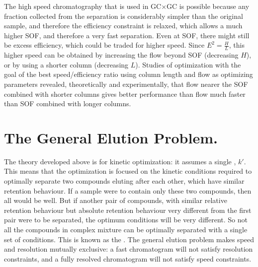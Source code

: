 The high speed chromatography that is used in GC×GC is possible because any
fraction collected from the \oneD separation is considerably simpler than the
original sample, and therefore the efficiency constraint is relaxed, which
allows a much higher SOF, and therefore a very fast \twoD
separation. Even at SOF, there might still be excess efficiency, which could be
traded for higher speed. Since \(E^2 = \frac{H}{L} \), this higher speed can be
obtained by increasing the flow beyond SOF (decreasing \(H\)), or by using a
shorter column (decreasing \(L\)). Studies of optimization with the goal of the
best speed/efficiency ratio using column length and flow as optimizing
parameters revealed, theoretically and experimentally, that flow nearer the SOF
combined with shorter columns gives better performance \autocite{Klee2002,
Reed1999} than flow much faster than SOF combined with longer columns.

\section{The General Elution Problem.}

The theory developed above is for kinetic optimization: it assumes a single
, \(k'\). This means that the optimization is focused
on the kinetic conditions required to optimally separate two compounds eluting
after each other, which have similar retention behaviour. If a sample were to
contain only these two compounds, then all would be well. But if another pair of
compounds, with similar relative retention behaviour but absolute retention behaviour
very different from the first pair were to be separated, the optimum conditions
will be very different. So not all the compounds in complex mixture can be
optimally separated with a single set of conditions. This is known as the
 \autocite[p. 779]{Skoog2007}. The general
elution problem makes speed and resolution mutually exclusive: a fast
chromatogram will not satisfy resolution constraints, and a fully resolved
chromatogram will not satisfy speed constraints.

